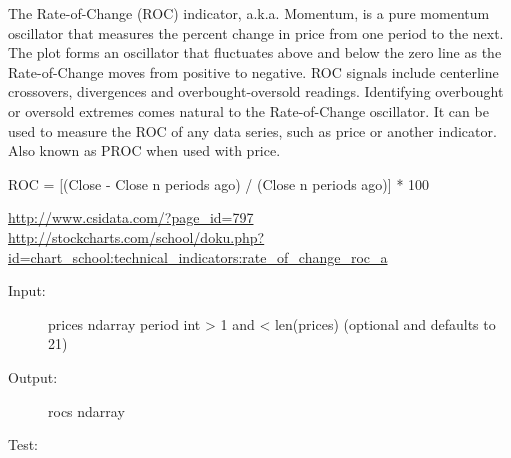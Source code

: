 \documentclass[letterpaper,10pt,english]{sphinxmanual}
\begin{document}
\begin{fulllineitems}
\label{reference:technical_indicators.technical_indicators.roc}
The Rate-of-Change (ROC) indicator, a.k.a. Momentum, is a pure momentum
oscillator that measures the percent change in price from one period to the
next.
The plot forms an oscillator that fluctuates above and below the zero line
as the Rate-of-Change moves from positive to negative.
ROC signals include centerline crossovers, divergences and
overbought-oversold readings. Identifying overbought or oversold extremes
comes natural to the Rate-of-Change oscillator.
It can be used to measure the ROC of any data series, such as price or
another indicator.
Also known as PROC when used with price.

ROC = {[}(Close - Close n periods ago) / (Close n periods ago){]} * 100

\href{http://www.csidata.com/?page\_id=797}{http://www.csidata.com/?page\_id=797}
\href{http://stockcharts.com/school/doku.php?id=chart\_school:technical\_indicators:rate\_of\_change\_roc\_a}{http://stockcharts.com/school/doku.php?id=chart\_school:technical\_indicators:rate\_of\_change\_roc\_a}
\begin{description}
\item[{Input:}] \leavevmode
prices ndarray
period int \textgreater{} 1 and \textless{} len(prices) (optional and defaults to 21)

\item[{Output:}] \leavevmode
rocs ndarray

\end{description}

Test:


\end{fulllineitems}
\end{document}
